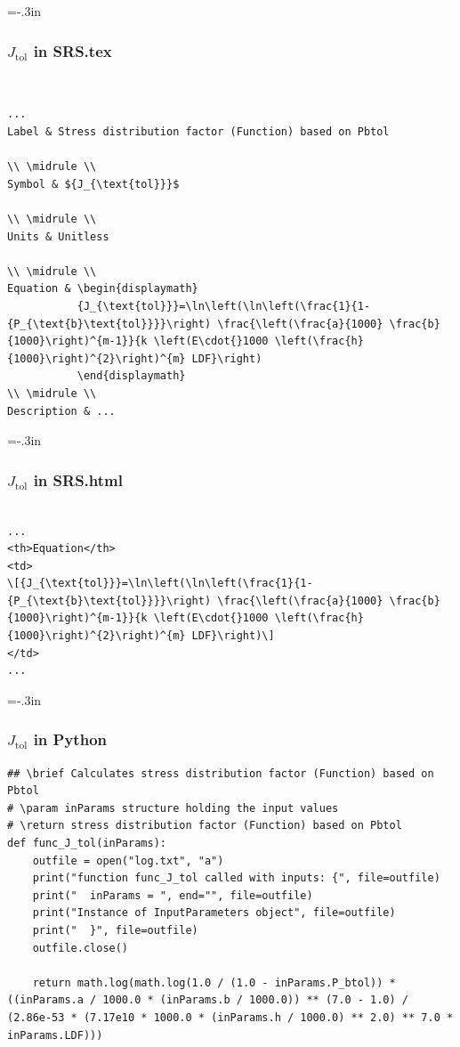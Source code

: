 \documentclass[usenames]{beamer}
\begin{document}
\hoffset=-.3in
\begin{frame}

\frametitle{$J_{\mbox{tol}}$ in SRS.tex}
~\\
\begin{lstlisting}
...
Label & Stress distribution factor (Function) based on Pbtol
        
\\ \midrule \\
Symbol & ${J_{\text{tol}}}$
         
\\ \midrule \\
Units & Unitless
        
\\ \midrule \\
Equation & \begin{displaymath}
           {J_{\text{tol}}}=\ln\left(\ln\left(\frac{1}{1-{P_{\text{b}\text{tol}}}}\right) \frac{\left(\frac{a}{1000} \frac{b}{1000}\right)^{m-1}}{k \left(E\cdot{}1000 \left(\frac{h}{1000}\right)^{2}\right)^{m} LDF}\right)
           \end{displaymath}
\\ \midrule \\
Description & ...
\end{lstlisting}
\end{frame}
\hoffset=0in
\hoffset=-.3in
\begin{frame}

\frametitle{$J_{\mbox{tol}}$ in SRS.html}

\begin{lstlisting}

...
<th>Equation</th>
<td>
\[{J_{\text{tol}}}=\ln\left(\ln\left(\frac{1}{1-{P_{\text{b}\text{tol}}}}\right) \frac{\left(\frac{a}{1000} \frac{b}{1000}\right)^{m-1}}{k \left(E\cdot{}1000 \left(\frac{h}{1000}\right)^{2}\right)^{m} LDF}\right)\]
</td>
...
\end{lstlisting}

\end{frame}
\hoffset=0in
\hoffset=-.3in
\begin{frame}

\frametitle{$J_{\mbox{tol}}$ in Python}

\begin{lstlisting}
## \brief Calculates stress distribution factor (Function) based on Pbtol
# \param inParams structure holding the input values
# \return stress distribution factor (Function) based on Pbtol
def func_J_tol(inParams):
    outfile = open("log.txt", "a")
    print("function func_J_tol called with inputs: {", file=outfile)
    print("  inParams = ", end="", file=outfile)
    print("Instance of InputParameters object", file=outfile)
    print("  }", file=outfile)
    outfile.close()
    
    return math.log(math.log(1.0 / (1.0 - inParams.P_btol)) * ((inParams.a / 1000.0 * (inParams.b / 1000.0)) ** (7.0 - 1.0) / (2.86e-53 * (7.17e10 * 1000.0 * (inParams.h / 1000.0) ** 2.0) ** 7.0 * inParams.LDF)))
\end{lstlisting}
\end{frame}
\end{document}
